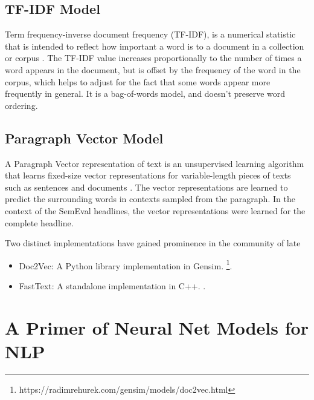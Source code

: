 \documentclass[11pt,a4paper]{article}
\begin{document}

  \subsection{TF-IDF Model} %
  \label{sub:tf_idf_model}
    Term frequency-inverse document frequency (TF-IDF), is a numerical statistic that is intended to reflect how important a word is to a document in a collection or corpus \cite{sparck1972statistical}. The TF-IDF value increases proportionally to the number of times a word appears in the document, but is offset by the frequency of the word in the corpus, which helps to adjust for the fact that some words appear more frequently in general. It is a bag-of-words model, and doesn't preserve word ordering.
  

  \subsection{Paragraph Vector Model} %
  \label{sub:paragraph_vectors_doc2vec}

    A Paragraph Vector representation of text is an unsupervised learning algorithm that learns fixed-size vector representations for variable-length pieces of texts such as sentences and documents \cite{le2014distributed}. The vector representations are learned to predict the surrounding words in contexts sampled from the paragraph. In the context of the SemEval headlines, the vector representations were learned for the complete headline.

    Two distinct implementations have gained prominence in the community of late
    \begin{itemize}
      \item 
        Doc2Vec: A Python library implementation in Gensim. \footnote{https://radimrehurek.com/gensim/models/doc2vec.html}.
      \item 
        FastText: A standalone implementation in C++. \cite{bojanowski2016enriching} \cite{joulin2016bag}.
    \end{itemize}
  



\section{A Primer of Neural Net Models for NLP} %
\label{sec:a_primer_of_neural_net_models_for_nlp}
\end{document}
